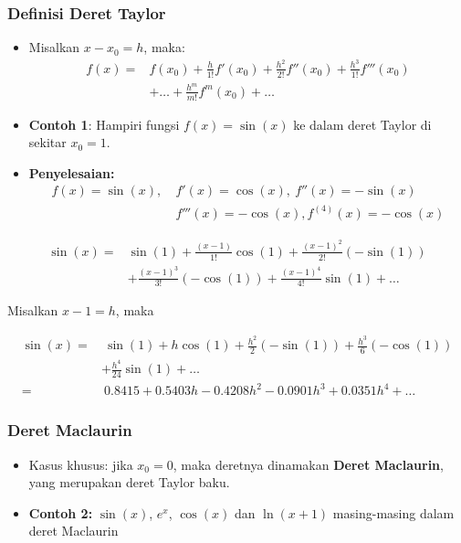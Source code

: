\documentclass[pdflatex,compress]{beamer}
\begin{document}
\begin{frame}
	\frametitle{Definisi Deret Taylor}
	\begin{itemize}
		\item Misalkan $ x - x_0 = h $, maka:
		\begin{align*}
			f(x) =& f(x_0) + \frac{h}{1!}f'(x_0) + \frac{h^2}{2!}f''(x_0) + \frac{h^3}{1!}f'''(x_0) \\
			&+ \dots + \frac{h^m}{m!}f^m(x_0) + \dots
		\end{align*}
		\item \textbf{Contoh 1}: Hampiri fungsi $ f(x) = \sin(x) $ ke dalam deret Taylor di sekitar $ x_0 = 1 $.
		\item \textbf{Penyelesaian:}
			\begin{align*}
				f(x) = \sin(x),~ &f'(x) = \cos(x),~f''(x) = -\sin(x) \\
				&f'''(x) = -\cos(x), f^{(4)}(x) = -\cos(x)
			\end{align*}
	\end{itemize}
\end{frame}

\begin{frame}
	\begin{align*}
		\sin(x) =& \sin(1) + \frac{(x-1)}{1!}\cos(1) + \frac{(x-1)^2}{2!}(-\sin(1)) \\
		& + \frac{(x-1)^3}{3!}(-\cos(1)) + \frac{(x-1)^4}{4!}\sin(1) + \dots
	\end{align*}

	Misalkan $ x - 1 = h $, maka
		
	\begin{align*}
		\sin(x) =&~ \sin(1) + h\cos(1) + \frac{h^2}{2}(-\sin(1)) + \frac{h^3}{6}(-\cos(1)) \\
		&+ \frac{h^4}{24}\sin(1) + \dots \\
		=&~ 0.8415 + 0.5403h - 0.4208h^2 - 0.0901h^3 + 0.0351h^4 + \dots
	\end{align*}
\end{frame}

\begin{frame}
	\frametitle{Deret Maclaurin}
	\begin{itemize}
		\item Kasus khusus: jika $ x_0 = 0$, maka deretnya dinamakan \textbf{Deret Maclaurin}, yang merupakan deret Taylor baku.
		\item \textbf{Contoh 2:} $ \sin(x) $, $ e^x $, $ \cos(x) $ dan $ \ln(x+1) $ masing-masing dalam deret Maclaurin
	\end{itemize}
\end{frame}
	
\end{document}
